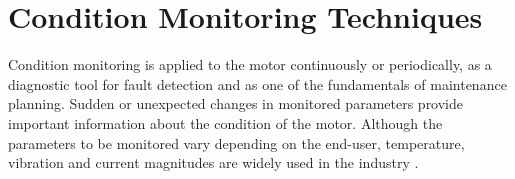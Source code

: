 

	   
		
		

\section{Condition Monitoring Techniques}

Condition monitoring is applied to the motor continuously or periodically, as a diagnostic tool for fault detection and as one of the fundamentals of maintenance planning. Sudden or unexpected changes in monitored parameters provide important information about the condition of the motor. Although the parameters to be monitored vary depending on the end-user, temperature, vibration and current magnitudes are widely used in the industry \cite{mistry2016rotating}.

